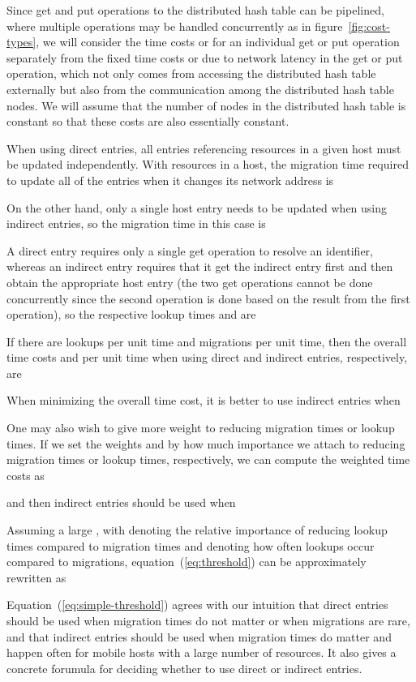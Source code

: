 \documentclass{article}
\begin{document}
Since get and put operations to the distributed hash table can be
pipelined, where multiple operations may be handled concurrently as in
figure~\ref{fig:cost-types}, we will consider the time costs  or
 for an individual get or put operation separately from the fixed
time costs  or  due to network latency in the get or put
operation, which not only comes from accessing the distributed hash
table externally but also from the communication among the distributed
hash table nodes.  We will assume that the number of nodes in the
distributed hash table is constant so that these costs are also
essentially constant.

When using direct entries, all entries referencing resources in a
given host must be updated independently.  With  resources in a
host, the migration time  required to update all of the
entries when it changes its network address is


On the other hand, only a single host entry needs to be updated when
using indirect entries, so the migration time  in this case
is


A direct entry requires only a single get operation to resolve an
identifier, whereas an indirect entry requires that it get the
indirect entry first and then obtain the appropriate host entry (the
two get operations cannot be done concurrently since the second
operation is done based on the result from the first operation), so
the respective lookup times  and  are


If there are  lookups per unit time and  migrations per unit
time, then the overall time costs  and  per unit time when
using direct and indirect entries, respectively, are



When minimizing the overall time cost, it is better to use indirect
entries when


One may also wish to give more weight to reducing migration times or
lookup times.  If we set the weights  and  by how much
importance we attach to reducing migration times or lookup times,
respectively, we can compute the weighted time costs as


and then indirect entries should be used when


Assuming a large , with  denoting the relative importance of
reducing lookup times compared to migration times and  denoting how
often lookups occur compared to migrations,
equation~(\ref{eq:threshold}) can be approximately rewritten as


Equation~(\ref{eq:simple-threshold}) agrees with our intuition that direct
entries should be used when migration times do not matter or when
migrations are rare, and that indirect entries should be used when
migration times do matter and happen often for mobile hosts with a
large number of resources.  It also gives a concrete forumula for
deciding whether to use direct or indirect entries.
\end{document}
